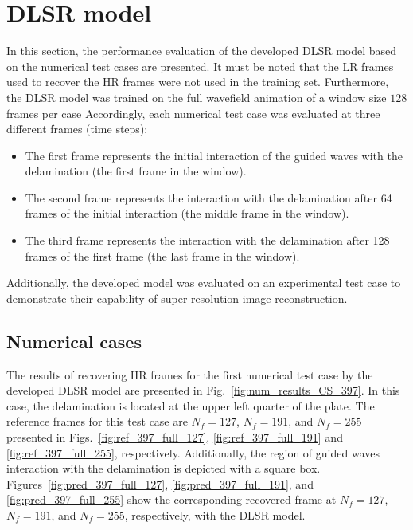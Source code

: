 \section{DLSR model}
\label{sec54}
In this section, the performance evaluation of the developed DLSR model based on the numerical test cases are presented.
It must be noted that the LR frames used to recover the HR frames were not used in the training set.
Furthermore,  the DLSR model was trained on the full wavefield animation of a window size $128$ frames per case
Accordingly, each numerical test case was evaluated at three different frames (time steps):
\begin{itemize}
	\item The first frame represents the initial interaction of the guided waves with the delamination (the first frame in the window).
	\item The second frame represents the interaction with the delamination after 64 frames of the initial interaction (the middle frame in the window).
	\item The third frame represents the interaction with the delamination after 128 frames of the first frame (the last frame in the window).
\end{itemize}

Additionally, the developed model was evaluated on an experimental test case to demonstrate their capability of super-resolution image reconstruction.

\subsection{Numerical cases}
\label{sec541}
The results of recovering HR frames for the first numerical test case by the developed DLSR model are presented in Fig.~\ref{fig:num_results_CS_397}.
In this case, the delamination is located at the upper left quarter of the plate.
The reference frames for this test case are $N_f=127$, $N_f=191$, and $N_f=255$ presented in Figs.~\ref{fig:ref_397_full_127}, \ref{fig:ref_397_full_191} and \ref{fig:ref_397_full_255}, respectively.
Additionally, the region of guided waves interaction with the delamination is depicted with a square box.
Figures~\ref{fig:pred_397_full_127}, \ref{fig:pred_397_full_191}, and \ref{fig:pred_397_full_255} show the corresponding recovered frame at $N_f=127$, $N_f=191$, and $N_f=255$, respectively, with the DLSR model.

